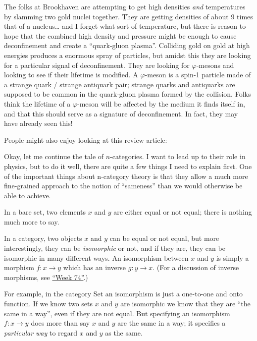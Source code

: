 \documentclass{article}
\def\tightlist{}
\renewcommand{\texttt}[1]{%
  \begingroup
  \ttfamily
  \begingroup\lccode`~=`/\lowercase{\endgroup\def~}{/\discretionary{}{}{}}%
  \begingroup\lccode`~=`[\lowercase{\endgroup\def~}{[\discretionary{}{}{}}%
  \begingroup\lccode`~=`.\lowercase{\endgroup\def~}{.\discretionary{}{}{}}%
  \catcode`/=\active\catcode`[=\active\catcode`.=\active
  \scantokens{#1\noexpand}%
  \endgroup
}
\begin{document}
The folks at Brookhaven are attempting to get high densities \emph{and}
temperatures by slamming two gold nuclei together. They are getting
densities of about 9 times that of a nucleus\ldots{} and I forget what
sort of temperature, but there is reason to hope that the combined high
density and pressure might be enough to cause deconfinement and create a
``quark-gluon plasma''. Colliding gold on gold at high energies produces
a enormous spray of particles, but amidst this they are looking for a
particular signal of deconfinement. They are looking for
\(\varphi\)-mesons and looking to see if their lifetime is modified. A
\(\varphi\)-meson is a spin-1 particle made of a strange quark / strange
antiquark pair; strange quarks and antiquarks are supposed to be common
in the quark-gluon plasma formed by the collision. Folks think the
lifetime of a \(\varphi\)-meson will be affected by the medium it finds
itself in, and that this should serve as a signature of deconfinement.
In fact, they may have already seen this!

People might also enjoy looking at this review article:


Okay, let me continue the tale of \(n\)-categories. I want to lead up to
their role in physics, but to do it well, there are quite a few things I
need to explain first. One of the important things about n-category
theory is that they allow a much more fine-grained approach to the
notion of ``sameness'' than we would otherwise be able to achieve.

In a bare set, two elements \(x\) and \(y\) are either equal or not
equal; there is nothing much more to say.

In a category, two objects \(x\) and \(y\) can be equal or not equal,
but more interestingly, they can be \emph{isomorphic} or not, and if
they are, they can be isomorphic in many different ways. An isomorphism
between \(x\) and \(y\) is simply a morphism \(f\colon x\to y\) which
has an inverse \(g\colon y\to x\). (For a discussion of inverse
morphisms, see \protect\hyperlink{week74}{``Week 74''}.)

For example, in the category Set an isomorphism is just a one-to-one and
onto function. If we know two sets \(x\) and \(y\) are isomorphic we
know that they are ``the same in a way'', even if they are not equal.
But specifying an isomorphism \(f\colon x\to y\) does more than say
\(x\) and \(y\) are the same in a way; it specifies a \emph{particular
way} to regard \(x\) and \(y\) as the same.
\end{document}

